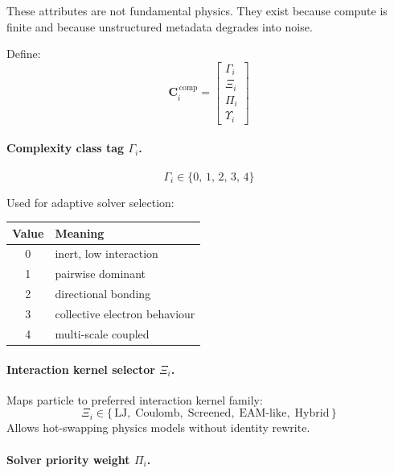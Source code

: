 \documentclass[11pt, a4paper, oneside]{article}
\theoremstyle{definition}
\theoremstyle{remark}
\newcommand{\boldC}{\mathbf{C}}
\begin{document}
These attributes are not fundamental physics.
They exist because compute is finite and because unstructured
metadata degrades into noise.

Define:
%
\begin{equation}
  \boldC_i^{\,\mathrm{comp}} =
  \begin{bmatrix}
    \Gamma_i \\ \Xi_i \\ \Pi_i \\ \Upsilon_i
  \end{bmatrix}
  \label{eq:comp-annotation}
\end{equation}

\paragraph{Complexity class tag \texorpdfstring{$\Gamma_i$}{Gamma-i}.}

\[
  \Gamma_i \in \{0,\,1,\,2,\,3,\,4\}
\]

Used for adaptive solver selection:
%
\begin{center}
\begin{tabular}{cl}
  \toprule
  Value & Meaning \\
  \midrule
  0 & inert, low interaction \\
  1 & pairwise dominant \\
  2 & directional bonding \\
  3 & collective electron behaviour \\
  4 & multi-scale coupled \\
  \bottomrule
\end{tabular}
\end{center}

\paragraph{Interaction kernel selector
          \texorpdfstring{$\Xi_i$}{Xi-i}.}

Maps particle to preferred interaction kernel family:
\[
  \Xi_i \in
  \{\,\text{LJ},\;
     \text{Coulomb},\;
     \text{Screened},\;
     \text{EAM-like},\;
     \text{Hybrid}\,\}
\]
Allows hot-swapping physics models without identity rewrite.

\paragraph{Solver priority weight
          \texorpdfstring{$\Pi_i$}{Pi-i}.}
\end{document}
